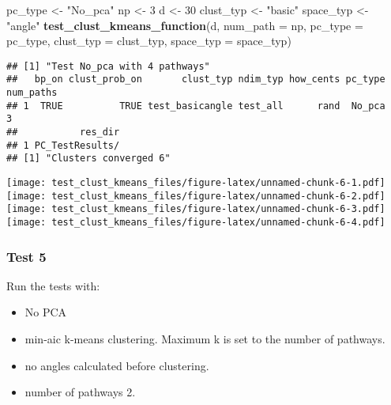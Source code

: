 \documentclass[
]{article}
\newenvironment{Shaded}{\begin{snugshade}}{\end{snugshade}}
\newcommand{\AttributeTok}[1]{\textcolor[rgb]{0.13,0.29,0.53}{#1}}
\newcommand{\DecValTok}[1]{\textcolor[rgb]{0.00,0.00,0.81}{#1}}
\newcommand{\FunctionTok}[1]{\textcolor[rgb]{0.13,0.29,0.53}{\textbf{#1}}}
\newcommand{\NormalTok}[1]{#1}
\newcommand{\OtherTok}[1]{\textcolor[rgb]{0.56,0.35,0.01}{#1}}
\newcommand{\StringTok}[1]{\textcolor[rgb]{0.31,0.60,0.02}{#1}}
\providecommand{\tightlist}{%
  \setlength{\itemsep}{0pt}\setlength{\parskip}{0pt}}
\begin{document}
\begin{Shaded}
\begin{Highlighting}[]
\NormalTok{pc\_type }\OtherTok{\textless{}{-}} \StringTok{"No\_pca"}
\NormalTok{np }\OtherTok{\textless{}{-}} \DecValTok{3}
\NormalTok{d }\OtherTok{\textless{}{-}} \DecValTok{30}
\NormalTok{clust\_typ }\OtherTok{\textless{}{-}} \StringTok{"basic"}
\NormalTok{space\_typ }\OtherTok{\textless{}{-}} \StringTok{"angle"}
\FunctionTok{test\_clust\_kmeans\_function}\NormalTok{(d,}
                           \AttributeTok{num\_path =}\NormalTok{ np,}
                           \AttributeTok{pc\_type =}\NormalTok{ pc\_type,}
                           \AttributeTok{clust\_typ =}\NormalTok{ clust\_typ,}
                           \AttributeTok{space\_typ =}\NormalTok{ space\_typ)}
\end{Highlighting}
\end{Shaded}

\begin{verbatim}
## [1] "Test No_pca with 4 pathways"
##   bp_on clust_prob_on       clust_typ ndim_typ how_cents pc_type num_paths
## 1  TRUE          TRUE test_basicangle test_all      rand  No_pca         3
##           res_dir
## 1 PC_TestResults/
## [1] "Clusters converged 6"
\end{verbatim}

\texttt{[image: test\_clust\_kmeans\_files/figure-latex/unnamed-chunk-6-1.pdf]}
\texttt{[image: test\_clust\_kmeans\_files/figure-latex/unnamed-chunk-6-2.pdf]}
\texttt{[image: test\_clust\_kmeans\_files/figure-latex/unnamed-chunk-6-3.pdf]}
\texttt{[image: test\_clust\_kmeans\_files/figure-latex/unnamed-chunk-6-4.pdf]}

\hypertarget{test-5}{%
\subsubsection{Test 5}\label{test-5}}

Run the tests with:

\begin{itemize}
\tightlist
\item
  No PCA
\item
  min-aic k-means clustering. Maximum k is set to the number of
  pathways.
\item
  no angles calculated before clustering.
\item
  number of pathways 2.
\end{itemize}
\end{document}
